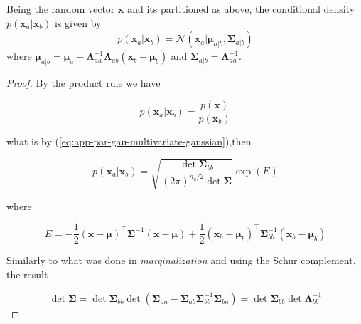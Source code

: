 \begin{appendices}
  \begin{theorem}[Conditioning]
    \label{theorem:app-gau-condit}
    Being the random vector $\mathbf{x}$ and its partitioned as above, the conditional density $p(\mathbf{x}_a | \mathbf{x}_b)$ is given by
    \begin{displaymath}
      p(\mathbf{x}_a | \mathbf{x}_b) = \mathcal{N}\left( \mathbf{x}_a | \boldsymbol{\mu}_{a|b}, \boldsymbol{\Sigma}_{a|b} \right)
    \end{displaymath}
    where $\boldsymbol{\mu}_{a|b} = \boldsymbol{\mu}_{a}-\boldsymbol{\Lambda}_{a a}^{-1} \boldsymbol{\Lambda}_{a b}\left(\mathbf{x}_{b}-\boldsymbol{\mu}_{b}\right)$ and $\boldsymbol{\Sigma}_{a|b} = \boldsymbol{\Lambda}_{aa}^{-1}$.
  \end{theorem}

  \begin{proof}
    By the product rule we have

    \begin{equation}
      p(\mathbf{x}_a|\mathbf{x}_b)=\frac{p(\mathbf{x})}{p(\mathbf{x}_b)}
    \end{equation}

    what is by (\ref{eq:app-par-gau-multivariate-gaussian}),then

    \begin{equation}
      p\left(\mathbf{x}_{a} | \mathbf{x}_{b}\right)=\sqrt{\frac{ \det \boldsymbol{\Sigma}_{b b}}{(2 \pi)^{n_{a} / 2}  \det \boldsymbol{\Sigma}}} \exp (E)
    \end{equation}

    where

    \begin{equation}
      E=-\frac{1}{2}(\mathbf{x}-\boldsymbol{\mu})^\top \boldsymbol{\Sigma}^{-1}(\mathbf{x}-\boldsymbol{\mu})+\frac{1}{2}\left(\mathbf{x}_{b}-\boldsymbol{\mu}_{b}\right)^\top \boldsymbol{\Sigma}_{b b}^{-1}\left(\mathbf{x}_{b}-\boldsymbol{\mu}_{b}\right)
    \end{equation}
    
    Similarly to what was done in \textit{marginalization} and using the Schur complement, the result

    \begin{equation}
      \det \boldsymbol{\Sigma}=\det \boldsymbol{\Sigma}_{b b} \det\left(\boldsymbol{\Sigma}_{a a}-\boldsymbol{\Sigma}_{a b} \boldsymbol{\Sigma}_{b b}^{-1} \boldsymbol{\Sigma}_{b a}\right) = \det \boldsymbol{\Sigma}_{b b} \det \boldsymbol{\Lambda}_{b b}^{-1}
    \end{equation}


\end{proof}
\end{appendices}
